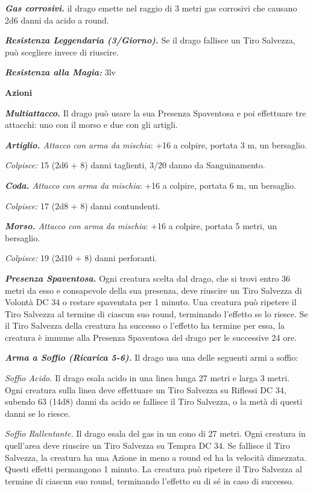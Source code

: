 \begin{multicols}{2}
{\emph{\textbf{Gas corrosivi.}} il drago emette nel raggio di 3 metri gas corrosivi che causano 2d6 danni da acido a round.

\emph{\textbf{Resistenza Leggendaria (3/Giorno).}} Se il drago fallisce un Tiro Salvezza, può scegliere invece di riuscire.

\emph{\textbf{Resistenza alla Magia:}} 3lv

\textbf{Azioni}

\emph{\textbf{Multiattacco.}} Il drago può usare la sua Presenza Spaventosa e poi effettuare tre attacchi: uno con il morso e due con gli artigli.

\emph{\textbf{Artiglio.} Attacco con arma da mischia}: +16 a colpire, portata 3 m, un bersaglio.

\emph{Colpisce:} 15 (2d6 + 8) danni taglienti, 3/20 danno da Sanguinamento.

\emph{\textbf{Coda.} Attacco con arma da mischia}: +16 a colpire, portata 6 m, un bersaglio.

\emph{Colpisce:} 17 (2d8 + 8) danni contundenti.

\emph{\textbf{Morso.} Attacco con arma da mischia}: +16 a colpire, portata 5 metri, un bersaglio.

\emph{Colpisce:} 19 (2d10 + 8) danni perforanti.

\emph{\textbf{Presenza Spaventosa.}} Ogni creatura scelta dal drago, che si trovi entro 36 metri da esso e consapevole della sua presenza, deve riuscire un Tiro Salvezza di Volontà DC 34 o restare spaventata per 1 minuto. Una creatura può ripetere il Tiro Salvezza al termine di ciascun suo round, terminando l'effetto se lo riesce. Se il Tiro Salvezza della creatura ha successo o l'effetto ha termine per essa, la creatura è immune alla Presenza Spaventosa del drago per le successive 24 ore.

\emph{\textbf{Arma a Soffio (Ricarica 5-6).}} Il drago usa una delle seguenti armi a soffio:

\emph{Soffio Acido.} Il drago esala acido in una linea lunga 27 metri e larga 3 metri. Ogni creatura sulla linea deve effettuare un Tiro Salvezza su Riflessi DC 34, subendo 63 (14d8) danni da acido se fallisce il Tiro Salvezza, o la metà di questi danni se lo riesce.

\emph{Soffio Rallentante.} Il drago esala del gas in un cono di 27 metri. Ogni creatura in quell'area deve riuscire un Tiro Salvezza su Tempra DC 34. Se fallisce il Tiro Salvezza, la creatura ha una Azione in meno a round ed ha la velocità dimezzata. Questi effetti permangono 1 minuto. La creatura può ripetere il Tiro Salvezza al termine di ciascun suo round, terminando l'effetto su di sé in caso di successo.

}
\end{multicols}
